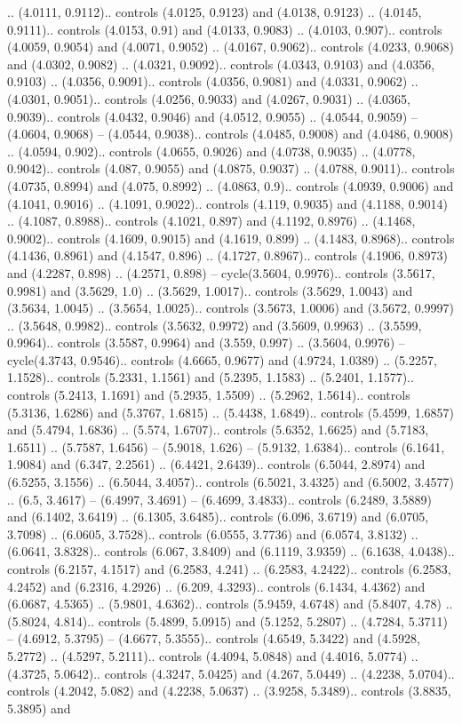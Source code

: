 .. (4.0111, 0.9112).. controls (4.0125, 0.9123) and (4.0138, 0.9123) .. (4.0145, 0.9111).. controls (4.0153, 0.91) and (4.0133, 0.9083) .. (4.0103, 0.907).. controls (4.0059, 0.9054) and (4.0071, 0.9052) .. (4.0167, 0.9062).. controls (4.0233, 0.9068) and (4.0302, 0.9082) .. (4.0321, 0.9092).. controls (4.0343, 0.9103) and (4.0356, 0.9103) .. (4.0356, 0.9091).. controls (4.0356, 0.9081) and (4.0331, 0.9062) .. (4.0301, 0.9051).. controls (4.0256, 0.9033) and (4.0267, 0.9031) .. (4.0365, 0.9039).. controls (4.0432, 0.9046) and (4.0512, 0.9055) .. (4.0544, 0.9059) -- (4.0604, 0.9068) -- (4.0544, 0.9038).. controls (4.0485, 0.9008) and (4.0486, 0.9008) .. (4.0594, 0.902).. controls (4.0655, 0.9026) and (4.0738, 0.9035) .. (4.0778, 0.9042).. controls (4.087, 0.9055) and (4.0875, 0.9037) .. (4.0788, 0.9011).. controls (4.0735, 0.8994) and (4.075, 0.8992) .. (4.0863, 0.9).. controls (4.0939, 0.9006) and (4.1041, 0.9016) .. (4.1091, 0.9022).. controls (4.119, 0.9035) and (4.1188, 0.9014) .. (4.1087, 0.8988).. controls (4.1021, 0.897) and (4.1192, 0.8976) .. (4.1468, 0.9002).. controls (4.1609, 0.9015) and (4.1619, 0.899) .. (4.1483, 0.8968).. controls (4.1436, 0.8961) and (4.1547, 0.896) .. (4.1727, 0.8967).. controls (4.1906, 0.8973) and (4.2287, 0.898) .. (4.2571, 0.898) -- cycle(3.5604, 0.9976).. controls (3.5617, 0.9981) and (3.5629, 1.0) .. (3.5629, 1.0017).. controls (3.5629, 1.0043) and (3.5634, 1.0045) .. (3.5654, 1.0025).. controls (3.5673, 1.0006) and (3.5672, 0.9997) .. (3.5648, 0.9982).. controls (3.5632, 0.9972) and (3.5609, 0.9963) .. (3.5599, 0.9964).. controls (3.5587, 0.9964) and (3.559, 0.997) .. (3.5604, 0.9976) -- cycle(4.3743, 0.9546).. controls (4.6665, 0.9677) and (4.9724, 1.0389) .. (5.2257, 1.1528).. controls (5.2331, 1.1561) and (5.2395, 1.1583) .. (5.2401, 1.1577).. controls (5.2413, 1.1691) and (5.2935, 1.5509) .. (5.2962, 1.5614).. controls (5.3136, 1.6286) and (5.3767, 1.6815) .. (5.4438, 1.6849).. controls (5.4599, 1.6857) and (5.4794, 1.6836) .. (5.574, 1.6707).. controls (5.6352, 1.6625) and (5.7183, 1.6511) .. (5.7587, 1.6456) -- (5.9018, 1.626) -- (5.9132, 1.6384).. controls (6.1641, 1.9084) and (6.347, 2.2561) .. (6.4421, 2.6439).. controls (6.5044, 2.8974) and (6.5255, 3.1556) .. (6.5044, 3.4057).. controls (6.5021, 3.4325) and (6.5002, 3.4577) .. (6.5, 3.4617) -- (6.4997, 3.4691) -- (6.4699, 3.4833).. controls (6.2489, 3.5889) and (6.1402, 3.6419) .. (6.1305, 3.6485).. controls (6.096, 3.6719) and (6.0705, 3.7098) .. (6.0605, 3.7528).. controls (6.0555, 3.7736) and (6.0574, 3.8132) .. (6.0641, 3.8328).. controls (6.067, 3.8409) and (6.1119, 3.9359) .. (6.1638, 4.0438).. controls (6.2157, 4.1517) and (6.2583, 4.241) .. (6.2583, 4.2422).. controls (6.2583, 4.2452) and (6.2316, 4.2926) .. (6.209, 4.3293).. controls (6.1434, 4.4362) and (6.0687, 4.5365) .. (5.9801, 4.6362).. controls (5.9459, 4.6748) and (5.8407, 4.78) .. (5.8024, 4.814).. controls (5.4899, 5.0915) and (5.1252, 5.2807) .. (4.7284, 5.3711) -- (4.6912, 5.3795) -- (4.6677, 5.3555).. controls (4.6549, 5.3422) and (4.5928, 5.2772) .. (4.5297, 5.2111).. controls (4.4094, 5.0848) and (4.4016, 5.0774) .. (4.3725, 5.0642).. controls (4.3247, 5.0425) and (4.267, 5.0449) .. (4.2238, 5.0704).. controls (4.2042, 5.082) and (4.2238, 5.0637) .. (3.9258, 5.3489).. controls (3.8835, 5.3895) and 